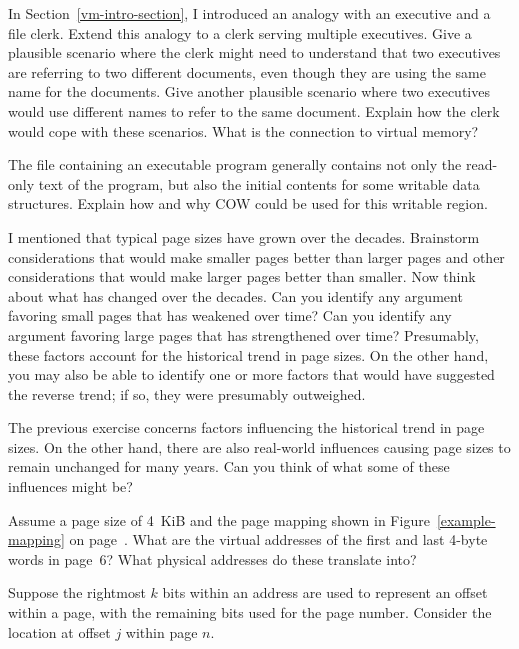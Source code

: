 \begin{chapterEnumerate}
\item
In Section~\ref{vm-intro-section}, I introduced an analogy with an
executive and a file clerk.  Extend this analogy to a clerk serving
multiple executives.  Give a plausible scenario where the clerk might
need to understand that two executives are referring to two different
documents, even though they are using the same name for the documents.
Give another plausible scenario where two executives would use
different names to refer to the same document.  Explain how the clerk
would cope with these scenarios.  What is the connection to virtual
memory?
\item
The file containing an executable program generally contains not only
the read-only text of the program, but also the initial contents for
some writable data structures.  Explain how and why COW could be used
for this writable region.
\item\label{page-size-execercise-1}
I mentioned that typical page sizes have grown over the decades.
Brainstorm considerations that would make smaller pages better than
larger pages and other considerations that would make larger pages better than
smaller.  Now think about what has changed over the decades.  Can you
identify any argument favoring small pages that has weakened over
time?  Can you identify any argument favoring large pages that has
strengthened over time?  Presumably, these factors account for the
historical trend in page sizes.  On the other hand, you may also be
able to identify one or more factors that would have suggested the
reverse trend; if so, they were presumably outweighed.
\item\label{page-size-execercise-2}
The previous exercise concerns factors influencing the historical
trend in page sizes.  On the other hand, there are also real-world
influences causing page sizes to remain unchanged for many years.  Can
you think of what some of these influences might be?
\item\label{page-6-translation-exercise}
Assume a page size of 4~KiB and the page mapping shown in
Figure~\ref{example-mapping} on page~\pageref{example-mapping}.  What are the virtual addresses of the
first and last 4-byte words in page~6?  What physical addresses do
these translate into?
\item
Suppose the rightmost $k$ bits within an address are used to represent
an offset within a page, with the remaining bits used for the page
number.  Consider the location at offset  $j$
within page $n$.

\end{chapterEnumerate}
